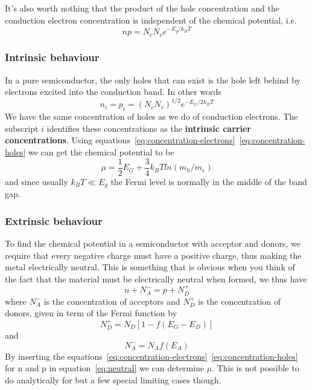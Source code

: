 \documentclass[11pt]{article}
\begin{document}
It's also worth nothing that the product of the hole concentration and the conduction electron concentration is independent of the chemical potential, i.e.
\begin{equation}
	np = N_c N_v e^{-E_g/k_B T}
	\label{eq:mass-action}
\end{equation}
\subsubsection{Intrinsic behaviour}
In a pure semiconductor, the only holes that can exist is the hole left behind by electrons excited into the conduction band. In other words
\begin{equation}
	n_i = p_i = (N_c N_v)^{1/2} e^{-E_G/2k_BT}
\end{equation}
We have the same concentration of holes as we do of conduction electrons. The subscript $i$ identifies these concentrations as the \textbf{intrinsic carrier concentrations}. Using equations~\ref{eq:concentration-electrons}~\ref{eq:concentration-holes} we can get the chemical potential to be
\begin{equation}
	\mu = \frac{1}{2} E_G + \frac{3}{4} k_B T ln(m_h/m_e)
\end{equation}
and since usually $k_B T \ll E_g$ the Fermi level is normally in the middle of the band gap.
\subsubsection{Extrinsic behaviour}
To find the chemical potential in a semiconductor with acceptor and donors, we require that every negative charge must have a positive charge, thus making the metal electrically neutral. This is something that is obvious when you think of the fact that the material must be electrically neutral when formed, we thus have
\begin{equation}
	n + N^-_A = p + N^+_D
	\label{eq:neutral}
\end{equation}
where $N^-_A$ is the concentration of acceptors and $N^+_D$ is the concentration of donors, given in term of the Fermi function by
\begin{equation}
	N^+_D = N_D [1-f(E_G - E_D)]
\end{equation}
and
\begin{equation}
	N^-_A = N_A f(E_A)
\end{equation}
By inserting the equations~\ref{eq:concentration-electrons}~\ref{eq:concentration-holes} for n and p in equation~\ref{eq:neutral} we can determine $\mu$. This is not possible to do analytically for but a few special limiting cases though.
\end{document}
